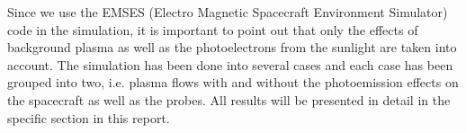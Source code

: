 Since we use the EMSES (Electro Magnetic Spacecraft Environment Simulator) code \citep{miyake_plasma_2013} in the
simulation, it is important to point out that only the effects of background plasma as
well as the photoelectrons from the sunlight are taken into account. The simulation
has been done into several cases and each case has been grouped into two, i.e. plasma
flows with and without the photoemission effects on the spacecraft as well as the probes.
All results will be presented in detail in the specific section in this report.
